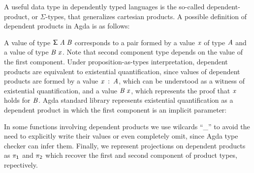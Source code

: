 \documentclass[sigconf]{acmart}
\makeatletter
\newcommand{\anonymous}{\kern0.06em \vbox{\hrule\@width.5em}}
\def\resethooks{%
  \global\let\SaveRestoreHook\empty
  \global\let\ColumnHook\empty}
\newcommand{\hsindent}[1]{\quad}%
\let\hspre\empty
\let\hspost\empty
\theoremstyle{definition}
\newcommand{\D}[1]{\blue{\mathsf{#1}}}
\newcommand{\C}[1]{\red{\mathsf{#1}}}
\newcommand{\F}[1]{\green{\mathsf{#1}}}
\newcommand{\V}[1]{\purple{\mathit{#1}}}
\makeatother
\begin{document}
A useful data type in dependently typed languages is the so-called dependent-product,
or $\Sigma$-types, that generalizes cartesian products. A possible definition of dependent products 
in Agda is as follows:
\resethooks
A value of type \ensuremath{\D{\Sigma}\;\V{A}\;\V{B}} corresponds to a pair formed by a value \ensuremath{\V{x}} of type \ensuremath{\V{A}} and 
a value of type \ensuremath{\V{B}\;\V{x}}. Note that second component type depends on the value of the first 
component. Under proposition-as-types interpretation, dependent products are equivalent
to existential quantification, since values of dependent products are formed by a value \ensuremath{\V{x}\;\mathbin{:}\;\V{A}},
which can be understood as a witness of existential quantification, and a value \ensuremath{\V{B}\;\V{x}}, which
represents the proof that \ensuremath{\V{x}} holds for \ensuremath{\V{B}}. Agda standard library represents existential
quantification as a dependent product in which the first component is an implicit parameter:
\resethooks
In some functions involving dependent products we use wilcards ``\_'' to avoid the need to
explicitly write their values or even completely omit, since Agda type checker can infer them. 
Finally, we represent projections on dependent products as \ensuremath{\F{\pi_1}} and \ensuremath{\F{\pi_2}} which recover the first
and second component of product types, repectively.
\end{document}
